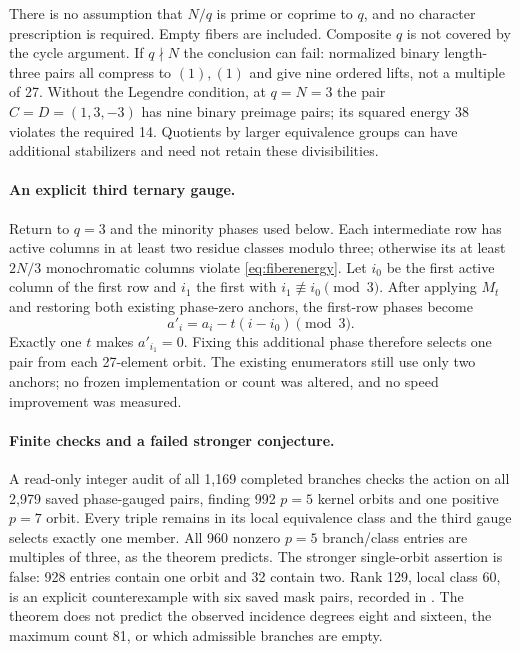 \documentclass[11pt]{article}
\begin{document}
There is no assumption that $N/q$ is prime or coprime to $q$, and no
character prescription is required. Empty fibers are included. Composite
$q$ is not covered by the cycle argument. If $q\nmid N$ the conclusion
can fail: normalized binary length-three pairs all compress to $(1),(1)$
and give nine ordered lifts, not a multiple of 27. Without the Legendre
condition, at $q=N=3$ the pair $C=D=(1,3,-3)$ has nine binary preimage
pairs; its squared energy 38 violates the required 14. Quotients by larger
equivalence groups can have additional stabilizers and need not retain
these divisibilities.

\paragraph{An explicit third ternary gauge.}
Return to $q=3$ and the minority phases used below. Each intermediate row
has active columns in at least two residue classes modulo three; otherwise
its at least $2N/3$ monochromatic columns violate \eqref{eq:fiberenergy}.
Let $i_0$ be the first active column of the first row and $i_1$ the first
with $i_1\not\equiv i_0\pmod3$. After applying $M_t$ and restoring both
existing phase-zero anchors, the first-row phases become
\[
 a'_i=a_i-t(i-i_0)\pmod3.
\]
Exactly one $t$ makes $a'_{i_1}=0$. Fixing this additional phase therefore
selects one pair from each 27-element orbit. The existing enumerators still
use only two anchors; no frozen implementation or count was altered, and no
speed improvement was measured.

\paragraph{Finite checks and a failed stronger conjecture.}
A read-only integer audit of all 1,169 completed branches checks the action
on all 2,979 saved phase-gauged pairs, finding 992 $p=5$ kernel orbits and
one positive $p=7$ orbit. Every triple remains in its local equivalence
class and the third gauge selects exactly one member. All 960 nonzero
$p=5$ branch/class entries are multiples of three, as the theorem predicts.
The stronger single-orbit assertion is false: 928 entries contain one
orbit and 32 contain two. Rank 129, local class 60, is an explicit
counterexample with six saved mask pairs, recorded in
. The theorem does not predict
the observed incidence degrees eight and sixteen, the maximum count 81,
or which admissible branches are empty.
\end{document}
